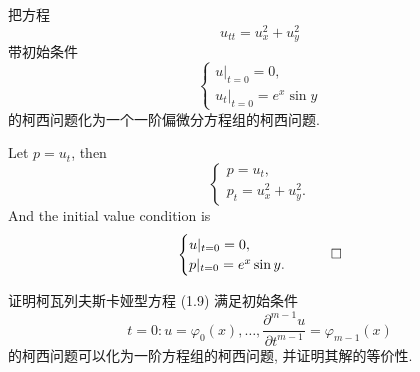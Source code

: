 \begin{exercise}
  把方程
  \[ u_{tt} = u_{x}^2 + u_{y}^2 \]
  带初始条件
  \[\begin{cases}
    u|_{t=0} = 0, \\
    u_t|_{t=0} = e^x \sin y
  \end{cases}\]
  的柯西问题化为一个一阶偏微分方程组的柯西问题.
\end{exercise}

\begin{solution}
  Let $p=u_t$, then
  \[\begin{cases}
    p = u_t, \\
    p_t = u_x^2 + u_y^2.
  \end{cases}\]
  And the initial value condition is
  \[\begin{cases}
    u|_{t=0} = 0, \\
    p|_{t=0} = e^x \sin y.
  \end{cases}\qedhere\]
\end{solution}


\begin{exercise}
  证明柯瓦列夫斯卡娅型方程 (1.9) 满足初始条件
  \begin{equation}
    t=0: u=\varphi_0(x),\ldots, \frac{\partial^{m-1}u}{\partial t^{m-1}} = \varphi_{m-1}(x) \tag{$\star$}
  \end{equation}
  的柯西问题可以化为一阶方程组的柯西问题, 并证明其解的等价性.
\end{exercise}

